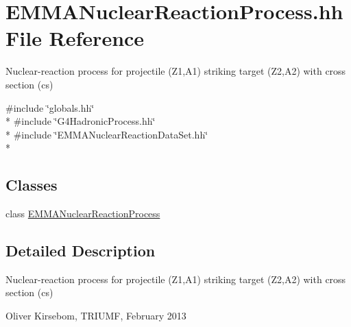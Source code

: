 \hypertarget{EMMANuclearReactionProcess_8hh}{\section{E\-M\-M\-A\-Nuclear\-Reaction\-Process.\-hh File Reference}
\label{EMMANuclearReactionProcess_8hh}
}


Nuclear-\/reaction process for projectile (Z1,A1) striking target (Z2,A2) with cross section (cs)  


{\ttfamily \#include \char`\"{}globals.\-hh\char`\"{}}\\*
{\ttfamily \#include \char`\"{}G4\-Hadronic\-Process.\-hh\char`\"{}}\\*
{\ttfamily \#include \char`\"{}E\-M\-M\-A\-Nuclear\-Reaction\-Data\-Set.\-hh\char`\"{}}\\*
\subsection*{Classes}
\begin{DoxyCompactItemize}
\item 
class \hyperlink{classEMMANuclearReactionProcess}{E\-M\-M\-A\-Nuclear\-Reaction\-Process}
\end{DoxyCompactItemize}


\subsection{Detailed Description}
Nuclear-\/reaction process for projectile (Z1,A1) striking target (Z2,A2) with cross section (cs) 
\begin{DoxyItemize}
\item Oliver Kirsebom, T\-R\-I\-U\-M\-F, February 2013 
\end{DoxyItemize}